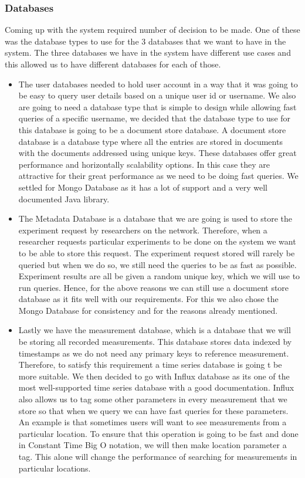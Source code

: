 \subsubsection{Databases}
Coming up with the system required number of decision to be made.
One of these was the database types to use for the 3 databases that we want to have in the system.
The three databases we have in the system have different use cases and this allowed us to have different databases for each of those.
\begin{itemize}
    \item The user databases needed to hold user account in a way that it was going to be easy to query user details based on a unique user id or username.
    We also are going to need a database type that is simple to design while allowing fast queries of a specific username, we decided that the database type to use for this database is going to be a document store database.
    A document store database is a database type where all the entries are stored in documents with the documents addressed using unique keys\cite{nosql_dbs}.
    These databases offer great performance and horizontally scalability options\cite{nosql_dbs}.
    In this case they are attractive for their great performance as we need to be doing fast queries.
    We settled for Mongo Database as it has a lot of support and a very well documented Java library.
    \item The Metadata Database is a database that we are going is used to store the experiment request by researchers on the network.
    Therefore, when a researcher requests particular experiments to be done on the system we want to be able to store this request.
    The experiment request stored will rarely be queried but when we do so, we still need the queries to be as fast as possible.
    Experiment results are all be given a random unique key, which we will use to run queries.
    Hence, for the above reasons we can still use a document store database as it fits well with our requirements.
    For this we also chose the Mongo Database for consistency and for the reasons already mentioned.
    \item Lastly we have the measurement database, which is a database that we will be storing all recorded measurements.
    This database stores data indexed by timestamps as we do not need any primary keys to reference measurement.
    Therefore, to satisfy this requirement a time series database is going t be more suitable.
    We then decided to go with Influx database as its one of the most well-supported time series database with a good documentation.
    Influx also allows us to tag some other parameters in every measurement that we store so that when we query we can have fast queries for these parameters.
    An example is that sometimes users will want to see measurements from a particular location.
    To ensure that this operation is going to be fast and done in Constant Time Big O notation, we will then make location parameter a tag.
    This alone will change the performance of searching for measurements in particular locations.
\end{itemize}
